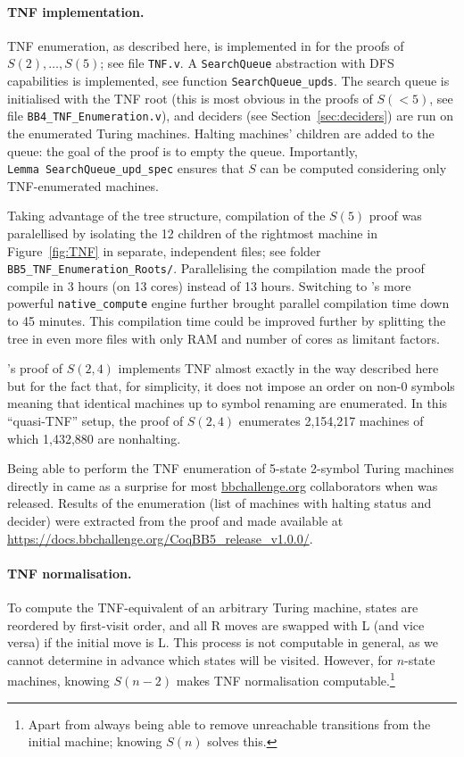 \paragraph{\CoqBB TNF implementation.} TNF enumeration, as described here, is implemented in \CoqBB for the proofs of $S(2),\dots,S(5)$; see file \texttt{TNF.v}. A \texttt{SearchQueue} abstraction with DFS capabilities is implemented, see function \texttt{SearchQueue\_upds}. The search queue is initialised with the TNF root (this is most obvious in the proofs of $S(<5)$, see file \texttt{BB4\_TNF\_Enumeration.v}), and deciders (see Section~\ref{sec:deciders}) are run on the enumerated Turing machines. Halting machines' children are added to the queue: the goal of the proof is to empty the queue. Importantly, \texttt{Lemma\ SearchQueue\_upd\_spec} ensures that $S$ can be computed considering only TNF-enumerated machines.

Taking advantage of the tree structure, compilation of the $S(5)$ proof was paralellised by isolating the 12 children of the rightmost machine in Figure~\ref{fig:TNF} in separate, independent files; see folder \texttt{BB5\_TNF\_Enumeration\_Roots/}. Parallelising the compilation made the proof compile in 3 hours (on 13 cores) instead of 13 hours. Switching to \Coq's more powerful \texttt{native\_compute} engine \cite{nativecompute} further brought parallel compilation time down to 45 minutes. This compilation time could be improved further by splitting the tree in even more files with only RAM and number of cores as limitant factors.

\CoqBB's proof of $S(2,4)$ implements TNF almost exactly in the way described here but for the fact that, for simplicity, it does not impose an order on non-0 symbols meaning that identical machines up to symbol renaming are enumerated. In this ``quasi-TNF'' setup, the proof of $S(2,4)$ enumerates 2,154,217 machines of which 1,432,880 are nonhalting.

Being able to perform the TNF enumeration of 5-state 2-symbol Turing machines directly in \Coq came as a surprise for most \url{bbchallenge.org} collaborators when \CoqBB was released. Results of the enumeration (\ie list of machines with halting status and decider) were extracted from the proof and made available at \url{https://docs.bbchallenge.org/CoqBB5_release_v1.0.0/}.




\paragraph{TNF normalisation.} To compute the TNF-equivalent of an arbitrary Turing machine, states are reordered by first-visit order, and all R moves are swapped with L (and vice versa) if the initial move is L. This process is not computable in general, as we cannot determine in advance which states will be visited. However, for $n$-state machines, knowing $S(n-2)$ makes TNF normalisation computable.\footnote{Apart from always being able to remove unreachable transitions from the initial machine; knowing $S(n)$ solves this. } %